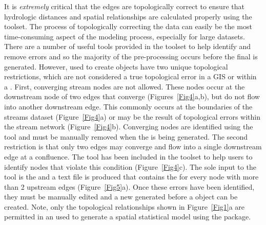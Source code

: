 \documentclass[article]{jss}
\begin{document}
It is \emph{extremely} critical that the edges are topologically
correct to ensure that hydrologic distances and spatial relationships
are calculated properly using the  toolset. The process of
topologically correcting the data can easily be the most
time-consuming aspect of the modeling process, especially for large
datasets. There are a number of useful tools provided in the
 toolset to help identify and remove errors
\citep{Theo:Norm:Pete:Ferr:Wade:func:2006} and so the majority of the
pre-processing occurs before the final  is generated. However, 
used to create  objects have two unique topological
restrictions, which are not considered a true topological error in a
GIS or within a . First, converging stream nodes are not
allowed. These nodes occur at the downstream node of two edges that
converge (Figures~\ref{Fig4}a,b), but do not flow into another
downstream edge. This commonly occurs at the boundaries of the streams
dataset (Figure~\ref{Fig4}a) or may be the result of topological
errors within the stream network (Figure~\ref{Fig4}b). Converging
nodes are identified using the   tool and must be manually removed when the  is being
generated. The second restriction is that only two edges may converge
and flow into a single downstream edge at a confluence. The
 tool has been included in the
 toolset to help users to identify  nodes that violate
this condition (Figure~\ref{Fig4}c). The sole input to the tool is the
 and a text file is produced that contains the  for every node with more than 2
upstream edges (Figure~\ref{Fig5}a). Once these errors have been identified, they must be
manually edited and a new  generated before a  object
can be created. Note, only the topological relationships shown in
Figure~\ref{Fig1}a are permitted in an  used to generate a spatial
statistical model using the  package.
\end{document}
